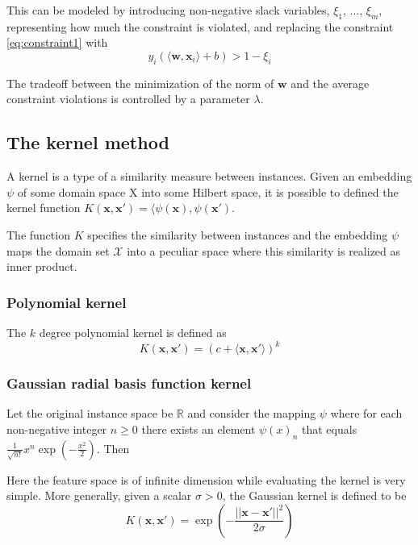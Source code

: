 \documentclass[a4paper, 11pt]{article}
\begin{document}
This can be modeled by introducing non-negative slack variables, $ \xi_1$, $\dots$, $\xi_m$, representing how much the constraint is violated, and replacing the constraint \ref{eq:constraint1} with
\begin{equation}
	y_i \left( \langle \mathbf{w}, \mathbf{x}_i \rangle +b \right) > 1 - \xi_i
\end{equation}

The tradeoff between the minimization of the norm of $\mathbf{w}$ and the average constraint violations is controlled by a parameter $\lambda$.

\subsection*{The kernel method}
A kernel is a type of a similarity measure between instances. Given an embedding $\psi$ of some domain space X into some Hilbert space, it is possible to defined
the kernel function $K(\mathbf{x}, \mathbf{x'}) = \langle \psi(\mathbf{x}), \psi(\mathbf{x'})$.

The function $K$ specifies the similarity between instances and the embedding $\psi$ maps the domain set $\mathcal{X}$ into a peculiar space where this similarity is realized as inner product.

\subsubsection*{Polynomial kernel}
The $k$ degree polynomial kernel is defined as
\begin{equation}
    K(\mathbf{x}, \mathbf{x'}) = \left( c + \langle \mathbf{x}, \mathbf{x'} \rangle \right)^k
\end{equation}

\subsubsection*{Gaussian radial basis function kernel}
Let the original instance space be $\mathbb{R}$ and consider the mapping $\psi$ where for each non-negative integer $n\geq 0$ there exists an element $\psi(x)_n$ that equals $\frac{1}{\sqrt{n!}} x^n \exp \left(- \frac{x^2}{2} \right)$. Then

Here the feature space is of infinite dimension while evaluating the kernel is very simple. More generally, given a scalar $\sigma > 0$, the Gaussian kernel is defined to be
\begin{equation}
K(\mathbf{x}, \mathbf{x'}) = \exp \left( - \dfrac{||\mathbf{x}-\mathbf{x'}||^2}{2\sigma} \right)
\end{equation}
\end{document}
